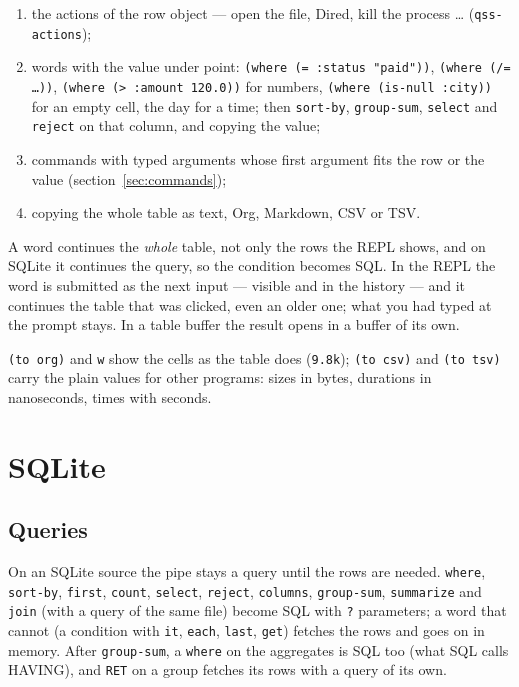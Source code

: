 \documentclass[
  paper=a4, fontsize=11pt, parskip=half, headings=small,
  toc=bibliography, numbers=noenddot, DIV=12
]{scrreprt}
\newcommand{\code}[1]{\texttt{#1}}
\newcommand{\kbd}[1]{\texttt{#1}}
\begin{document}
\begin{enumerate}
\item the actions of the row object --- open the file, Dired, kill the
  process \ldots{} (\code{qss-actions});
\item words with the value under point: \code{(where (= :status "paid"))},
  \code{(where (/= \ldots))}, \code{(where (> :amount 120.0))} for numbers,
  \code{(where (is-null :city))} for an empty cell, the day for a time;
  then \code{sort-by}, \code{group-sum}, \code{select} and \code{reject} on that
  column, and copying the value;
\item commands with typed arguments whose first argument fits the row or the
  value (section~\ref{sec:commands});
\item copying the whole table as text, Org, Markdown, CSV or TSV.
\end{enumerate}

A word continues the \emph{whole} table, not only the rows the REPL shows, and on
SQLite it continues the query, so the condition becomes SQL. In the REPL the
word is submitted as the next input --- visible and in the history --- and it
continues the table that was clicked, even an older one; what you had typed at
the prompt stays. In a table buffer the result opens in a buffer of its own.

\code{(to org)} and \kbd{w} show the cells as the table does (\code{9.8k});
\code{(to csv)} and \code{(to tsv)} carry the plain values for other programs:
sizes in bytes, durations in nanoseconds, times with seconds.

\chapter{SQLite}

\section{Queries}

On an SQLite source the pipe stays a query until the rows are needed.
\code{where}, \code{sort-by}, \code{first}, \code{count}, \code{select},
\code{reject}, \code{columns}, \code{group-sum}, \code{summarize} and
\code{join} (with a query of the same file) become SQL with \code{?}
parameters; a word that cannot (a condition with \code{it}, \code{each},
\code{last}, \code{get}) fetches the rows and goes on in memory. After
\code{group-sum}, a \code{where} on the aggregates is SQL too (what SQL calls
HAVING), and \kbd{RET} on a group fetches its rows with a query of its own.
\end{document}
